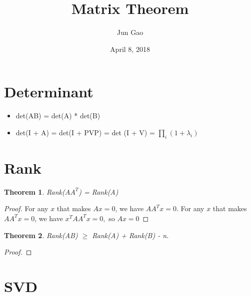 \documentclass[12pt]{article}
\newtheorem{theorem}{Theorem}
\begin{document}
 
\title{Matrix Theorem}
\author{Jun Gao}
\date{April 8, 2018}

\maketitle
\section{Determinant}
\begin{itemize}
\item det(AB) = det(A) * det(B)
\item det(I + A) = det(I + PVP) = det (I + V) = $\prod_i (1 + \lambda_i)$
\end{itemize}
 

\section{Rank}
\begin{theorem}
	Rank($AA^T$) = Rank(A)
\end{theorem}
\begin{proof}
	For any $x$ that makes $Ax=0$, we have $AA^Tx=0$. For any $x$ that makes $AA^Tx=0$, we have $x^TAA^Tx=0,$ so $Ax=0$
\end{proof}
\begin{theorem}
	Rank(AB) $\ge$ Rank(A) + Rank(B) - n.
\end{theorem}
\begin{proof}
	
\end{proof}
\section{SVD}
\end{document}

